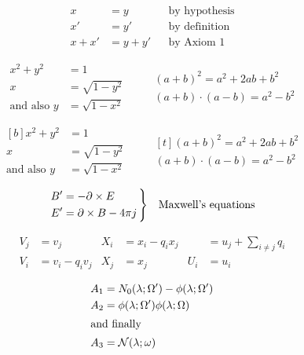 \documentclass{article}
\begin{document}
\renewcommand\minalignsep{2em}
\begin{align}
  x      &= y      && \text{by hypothesis} \\
      x' &= y'     && \text{by definition} \\
  x + x' &= y + y' && \text{by Axiom 1}
\end{align}

\begin{equation}
\begin{aligned}
  x^2 + y^2  &= 1               \\
  x          &= \sqrt{1-y^2}    \\
 \text{and also }y &= \sqrt{1-x^2}
\end{aligned}               \qquad
\begin{gathered}
 (a + b)^2 = a^2 + 2ab + b^2    \\
 (a + b) \cdot (a - b) = a^2 - b^2
\end{gathered}      \end{equation}

\begin{equation}
\begin{aligned}[b]
  x^2 + y^2  &= 1               \\
  x          &= \sqrt{1-y^2}    \\
 \text{and also }y &= \sqrt{1-x^2}
\end{aligned}               \qquad
\begin{gathered}[t]
 (a + b)^2 = a^2 + 2ab + b^2    \\
 (a + b) \cdot (a - b) = a^2 - b^2
\end{gathered}
\end{equation}
\newenvironment{rcase}
    {\left.\begin{aligned}}
    {\end{aligned}\right\rbrace}

\begin{equation*}
  \begin{rcase}
    B' &= -\partial\times E          \\
    E' &=  \partial\times B - 4\pi j \,
  \end{rcase}
  \quad \text {Maxwell's equations}
\end{equation*}

\begin{equation} \begin{aligned}
  V_j &= v_j                      &
  X_i &= x_i - q_i x_j            &
      &= u_j + \sum_{i\ne j} q_i \\
  V_i &= v_i - q_i v_j            &
  X_j &= x_j                      &
  U_i &= u_i
\end{aligned} \end{equation}

\begin{align}
  A_1 &= N_0 (\lambda ; \Omega')
         -  \phi ( \lambda ; \Omega')   \\
  A_2 &= \phi (\lambda ; \Omega')
            \phi (\lambda ; \Omega)     \\
\intertext{and finally}
  A_3 &= \mathcal{N} (\lambda ; \omega)
\end{align}
\end{document}

